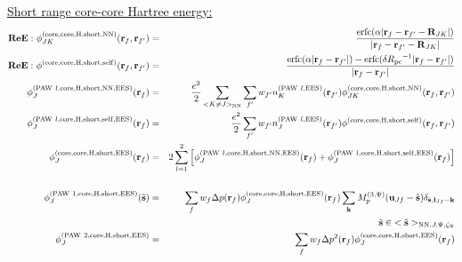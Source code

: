 \documentclass[paper=a4, fontsize=11pt]{article} %
\numberwithin{equation}{section} %
\numberwithin{figure}{section} %
\numberwithin{table}{section} %
\newcommand{\bu}{{\bf{u}}}
\newcommand{\bl}{{\bf{l}}}
\newcommand{\bk}{{\bf{k}}}
\newcommand{\bs}{{\bf{s}}}
\newcommand{\br}{{\bf{r}}}
\newcommand{\bR}{{\bf{R}}}
\newcommand{\hs}{{\hat{\bf{s}}}}
\newcommand{\rEES}{{\mathrm{EES}}}
\newcommand{\rcore}{{\mathrm{core}}}
\newcommand{\rNN}{{\mathrm{NN}}}
\newcommand{\rself}{{\mathrm{self}}}
\newcommand{\rshort}{{\mathrm{short}}}
\newcommand{\rerfc}{{\mathrm{erfc}}}
\newcommand{\rP}{{\mathrm{PAW}}}
\newcommand{\rH}{{\mathrm{H}}}
\newcommand{\Rpc}{{R_{\mathrm{pc}}}}
\newcommand{\Mp}{{M_p^{(3,\Psi)}}}
\newcommand{\hsJp}{{<\hs>_{\rNN,J,\Psi,\zeta_\Psi}}}
\newcommand{\hsinJp}{{\ \ \ \ \ \hs  \in  \hsJp}}
\newcommand{\ReE}{{{\bf ReE:\ }}}
\begin{document}
\underline{Short range core-core Hartree energy:}
\begin{eqnarray}
\ReE \phi_{JK}^{(\rcore,\rcore,\rH,\rshort,\rNN)}(\br_f,\br_{f'}) &=& \frac{\rerfc(\alpha|\br_f-\br_{f'}-\bR_{JK}|)}{|\br_f-\br_{f'}-\bR_{JK}|} \\
\ReE \phi^{(\rcore,\rcore,\rH,\rshort,\rself)}(\br_f,\br_{f'})&=&\frac{\rerfc(\alpha|\br_f-\br_{f'}|)-\rerfc(\delta \Rpc^{-1}|\br_f-\br_{f'}|)}{|\br_f-\br_{f'}|} \\
\phi_J^{(\rP\ l,\rcore,\rH,\rshort,\rNN,\rEES)}(\br_f) &=& \frac{e^2}{2}\sum_{<K \neq J>_\rNN}\sum_{f'}w_{f'}n_K^{(\rP\ l,\rEES)}(\br_{f'}) \phi_{JK}^{(\rcore,\rcore,\rH,\rshort,\rNN)}(\br_f,\br_{f'}) \\
\phi_J^{(\rP\ l,\rcore,\rH,\rshort,\rself,\rEES)}(\br_f) & =& \frac{e^2}{2}\sum_{f'} w_{f'} n_J^{(\rP\ l,\rEES)}(\br_{f'})\phi^{(\rcore,\rcore,\rH,\rshort,\rself)}(\br_f,\br_{f'}) \\
\label{phi:fHshortl}
\phi_J^{(\rcore,\rcore,\rH,\rshort,\rEES)}(\br_f) &=& 2\sum_{l=1}^2\left[\phi_J^{(\rP\ l,\rcore,\rH,\rshort,\rNN,\rEES)}(\br_f) + \phi_J^{(\rP\ l,\rcore,\rH,\rshort,\rself,\rEES)}(\br_f) \right] \nonumber\\
\\
\label{phi:sPAW1coreHshort}
\phi_J^{(\rP\ 1,\rcore,\rH,\rshort,\rEES)}(\hs) &=& \sum_f w_f \Delta p(\br_f) \phi_J^{(\rcore,\rcore,\rH,\rshort,\rEES)}(\br_f) \sum_{\bk} \Mp(\bu_{Jf}-\hat \bs)\delta_{\hat \bs,\bl_{Jf}-\bk} \nonumber \\
&\ &\hspace*{2.4in} \hsinJp \\
\label{phi:PAW2coreHshort}
\phi_J^{(\rP\ 2,\rcore,\rH,\rshort,\rEES)} &=& \sum_f w_f \Delta p^2(\br_f) \phi_J^{(\rcore,\rcore,\rH,\rshort,\rEES)}(\br_f) 
\end{eqnarray}
\end{document}
